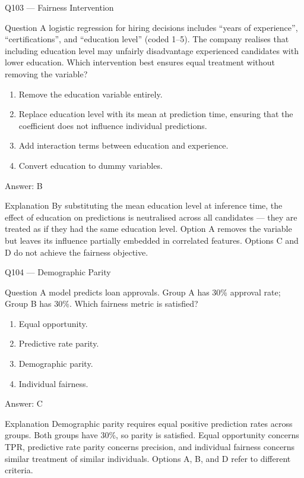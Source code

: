 \documentclass[aspectratio=169,8pt]{beamer}
\begin{document}
\begin{frame}{Q103 --- Fairness Intervention}
\begin{block}{Question}
A logistic regression for hiring decisions includes ``years of experience'', ``certifications'', and ``education level'' (coded 1--5). The company realises that including education level may unfairly disadvantage experienced candidates with lower education. Which intervention best ensures equal treatment without removing the variable?
\end{block}
\begin{enumerate}
\item Remove the education variable entirely.
\item Replace education level with its mean at prediction time, ensuring that the coefficient does not influence individual predictions.
\item Add interaction terms between education and experience.
\item Convert education to dummy variables.
\end{enumerate}
\begin{exampleblock}{Answer: B}\end{exampleblock}
\begin{block}{Explanation}
By substituting the mean education level at inference time, the effect of education on predictions is neutralised across all candidates --- they are treated as if they had the same education level. Option A removes the variable but leaves its influence partially embedded in correlated features. Options C and D do not achieve the fairness objective.
\end{block}
\end{frame}

\begin{frame}{Q104 --- Demographic Parity}
\begin{block}{Question}
A model predicts loan approvals. Group A has 30\% approval rate; Group B has 30\%. Which fairness metric is satisfied?
\end{block}
\begin{enumerate}
\item Equal opportunity.
\item Predictive rate parity.
\item Demographic parity.
\item Individual fairness.
\end{enumerate}
\begin{exampleblock}{Answer: C}\end{exampleblock}
\begin{block}{Explanation}
Demographic parity requires equal positive prediction rates across groups. Both groups have 30\%, so parity is satisfied. Equal opportunity concerns TPR, predictive rate parity concerns precision, and individual fairness concerns similar treatment of similar individuals. Options A, B, and D refer to different criteria.
\end{block}
\end{frame}
\end{document}
